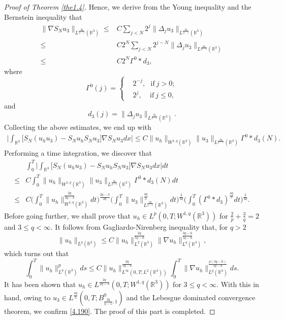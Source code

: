 \documentclass[11pt]{article}
\theoremstyle{plain}\newtheorem{definition}{Definition}[section]
\theoremstyle{definition}\newtheorem{theorem}{Theorem}[section]
\theoremstyle{plain}\newtheorem{lemma}[theorem]{Lemma}
\theoremstyle{plain}\newtheorem{coro}[theorem]{Corollary}
\theoremstyle{plain}\newtheorem{prop}[theorem]{Proposition}
\theoremstyle{remark}\newtheorem{remark}{Remark}[section]
\newcommand{\B}{\Big}
\newcommand{\be}{\begin{equation}}
\newcommand{\ee}{\end{equation}}
\newcommand{\ba}{\begin{aligned}}
\newcommand{\ea}{\end{aligned}}
\newcommand{\f}{\frac}
\numberwithin{equation}{section}
\begin{document}
\begin{proof}[Proof of Theorem \ref{the1.4}]
Hence, we derive from  the Young inequality and the Bernstein inequality  that
 \be\label{4.25}\ba
\|\nabla S_{N}u_{3}\|_{ L^{\f{2q}{q-1}}  (\mathbb{R}^{3})} \leq& C   \sum_{j< N }2^{j}\|   \Delta_{j} u_{3}  \|_{L^{\f{2q}{q-1}}(\mathbb{R}^{3})}
\\
\leq
& C 2^{N}  \sum_{j< N }2^{j-N}\|   \Delta_{j} u_{3}  \|_{L^{\f{2q}{q-1}}(\mathbb{R}^{3})}
\\
\leq& C 2^{   N} \Gamma^{0}\ast d_{3} ,
\ea\ee
where
$$
\Gamma^{0}(j)=\left\{\ba\label{1.10}
&2^{- j},~~~\text{if}~j>0; \\
&2^{j },~~~~~\text{if}~j\leq 0,
\ea\right.$$
and
$$
d_{3}(j)=\| {\Delta}_{j}u_3\|_{L^{\f{2q}{q-1}} (\mathbb{R}^{3})}.
$$
 Collecting the above estimates, we end up with
 $$\ba
 \B| \int_{\mathbb{R}^{3}}\big[S_{N}(u_{h}u_{3}) -S_{N}u_{h} S_{N}u_{3} \big]\nabla  S_{N}u_{3} dx \B|
 \leq
 C  \|u_{h}\|_{W^{1, q} (\mathbb{R}^{3})} \| u_{3}  \|_{ L^{\f{2q}{q-1}} (\mathbb{R}^{3})}\Gamma^{0}\ast d_{3} (N).
 \ea
 $$
 Performing a time integration, we discover that
 $$\ba
 &\int_{0}^{T}\B| \int_{\mathbb{R}^{3}}\big[S_{N}(u_{h}u_{3}) -S_{N}u_{h} S_{N}u_{3} \big]\nabla  S_{N}u_{3} dx \B|dt\\
 \leq&
 C \int_{0}^{T}\|u_{h}\|_{W^{1, q} (\mathbb{R}^{3})} \| u_{3}  \|_{ L^{\f{2q}{q-1}} (\mathbb{R}^{3})}\Gamma^{0}\ast d_{3} (N) dt\\
 \leq&
 C \B(\int_{0}^{T}\|u_{h}\|^{\f{2q}{2q-3}}_{W^{1, q} (\mathbb{R}^{3})} dt\B)^{\f{2q-3}{2q}}\B(\int_{0}^{T}\| u_{3}  \|^{\f{4q}{3}} _{ L^{\f{2q}{q-1}} (\mathbb{R}^{3})}dt\B)^{\f{3}{4q}}\B(\int_{0}^{T}(\Gamma^{0}\ast d_{3} )^ {\f{4q}{3}}dt\B)^{\f{3}{4q}}.
 \ea
 $$
 Before going further, we shall prove that $  u_{h}\in L^{p }(0,T;W^{1, q }(\mathbb{R}^{3}))$ for $\f{2}{p }+\f{3}{q }=2$ and $3\leq q < \infty$.
It follows from Gagliardo-Nirenberg inequality that, for $q>2$
$$
\|u_{h}\|_{L^{q}(\mathbb{R}^{3})}\leq C \|u_{h}\|^{\f{2q}{5q-6}}_{L^{2}(\mathbb{R}^{3})}\|\nabla u_{h}\|_{L^{q}(\mathbb{R}^{3})}^{\f{3q-6}{5q-6}},
$$
which turns out that
$$
\int_{0}^{T}\|u_{h}\|^{p}_{L^{q}(\mathbb{R}^{3})}ds\leq C \|u_{h}\|^{\f{2q}{5q-6}}_{L^{\infty}(0,T; L^{2}(\mathbb{R}^{3}))}\int_{0}^{T}\|\nabla u_{h}\|_{L^{q}(\mathbb{R}^{3})}^{\f{p(3q-6)}{5q-6}}ds.
$$
It has been shown that $  u_{h}\in L^{\f{2q}{2q-3}}(0,T;W^{1, q }(\mathbb{R}^{3}))$ for   $3\leq q < \infty$. With this in hand, owing to  $u_{3}\in L^{\f{4q}{3}} (0,T;B^{0}_{\f{2q}{q-1},1}
  ) $ and the Lebesgue dominated convergence theorem,  we confirm \eqref{4.190}. The proof of this part is completed.




\end{proof}
\end{document}
